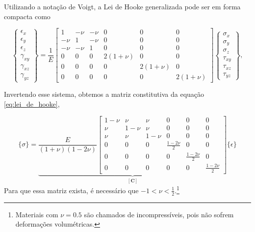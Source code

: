 Utilizando a notação de Voigt, a Lei de Hooke generalizada pode ser em forma compacta como

\begin{equation}
    \begin{Bmatrix}
        \epsilon_x \\
        \epsilon_y \\
        \epsilon_z \\
        \gamma_{xy} \\
        \gamma_{xz} \\
        \gamma_{yz}
    \end{Bmatrix}
    =
    \frac{1}{E}
    \begin{bmatrix}
        1 & -\nu & -\nu & 0 & 0 & 0 \\
        -\nu & 1 & -\nu & 0 & 0 & 0 \\
        -\nu & -\nu & 1 & 0 & 0 & 0 \\
        0 & 0 & 0 & 2(1+\nu) & 0 & 0 \\
        0 & 0 & 0 & 0 & 2(1+\nu) & 0 \\
        0 & 0 & 0 & 0 & 0 & 2(1+\nu)
    \end{bmatrix}
    \begin{Bmatrix}
        \sigma_x \\
        \sigma_y \\
        \sigma_z \\
        \tau_{xy} \\
        \tau_{xz} \\
        \tau_{yz}
    \end{Bmatrix},
    \label{eq:lei_de_hooke_generalizada_matricial}
\end{equation}

Invertendo esse sistema, obtemos a matriz constitutiva da equação \ref{eq:lei_de_hooke},

\begin{equation}
    \{\sigma\} = \underbrace{\frac{E}{(1+\nu)(1-2\nu)}
    \begin{bmatrix} 1-\nu & \nu & \nu & 0 & 0 & 0 \\
        \nu & 1-\nu & \nu & 0 & 0 & 0 \\
        \nu & \nu & 1-\nu & 0 & 0 & 0 \\
        0 & 0 & 0 & \frac{1-2\nu}{2} & 0 & 0 \\
        0 & 0 & 0 & 0 & \frac{1-2\nu}{2} & 0 \\
        0 & 0 & 0 & 0 & 0 & \frac{1-2\nu}{2} 
    \end{bmatrix}}_{[\bm{C}]}
    \{\epsilon\}
\end{equation}
Para que essa matriz exista, é necessário que $-1 < \nu < \frac{1}{2}$.\footnote{Materiais com $\nu = 0.5$ são chamados de incompressíveis, pois não sofrem deformações volumétricas.}

